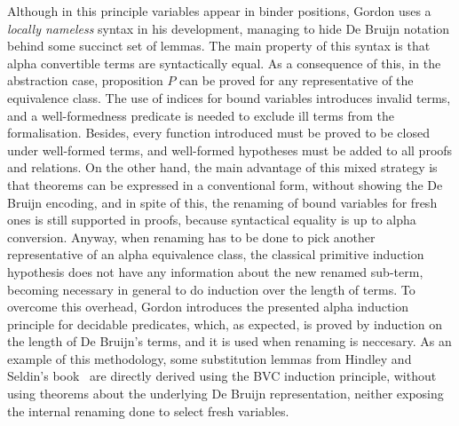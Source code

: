\documentclass[preprint,10pt]{sigplanconf}
\begin{document}
Although in this principle variables appear in binder positions, 
Gordon uses a \emph{locally nameless} syntax in his development, managing to hide  De Bruijn notation behind some succinct set of lemmas. 
The main property of this syntax is that alpha convertible terms are syntactically equal.
As a consequence of this, in the abstraction case, proposition $P$ can be proved for any representative of the equivalence class.
The use of indices for bound variables introduces invalid terms, and a well-formedness predicate is needed to exclude ill terms from the formalisation. 
Besides, every function introduced must be proved to be closed under well-formed terms, and well-formed hypotheses must be added to all proofs and relations. 
On the other hand, the main advantage of this mixed strategy is that theorems can be expressed in a conventional form, without showing the De Bruijn encoding, and in spite of this, the renaming of bound variables for fresh ones is still supported in proofs, because syntactical equality is up to alpha conversion. 
Anyway, when renaming has to be done to pick another representative of an alpha equivalence class, the classical primitive induction hypothesis does not have any information about the new renamed sub-term, becoming necessary in general to do induction over the length of terms. 
To overcome this overhead, Gordon introduces the presented alpha induction principle for decidable predicates, which, as expected, is proved by induction on the length of De Bruijn's terms, and it is used when renaming is neccesary.
As an example of this methodology, some substitution lemmas from Hindley and Seldin's book~\cite{DBLP:books/cu/HindleyS86} are directly derived using the BVC induction principle, without using theorems about the underlying De Bruijn representation, neither exposing the internal renaming done to select fresh variables.
\end{document}
